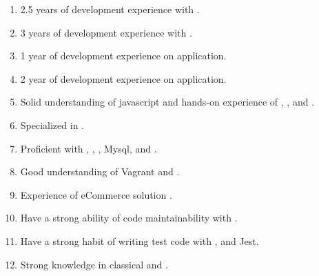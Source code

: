   \begin{enumerate}[leftmargin=4ex, nosep, noitemsep]
    \item 2.5 years of development experience with .
    \item 3 years of development experience with .
    \item 1 year of development experience on  application.
    \item 2 year of development experience on  application.
    \item Solid understanding of javascript and hands-on experience of
        , ,  and .
    \item Specialized in .
    \item Proficient with , , , Mysql, and .
    \item Good understanding of Vagrant and .
    \item Experience of eCommerce solution .
    \item Have a strong ability of code maintainability with .
    \item Have a strong habit of writing test code with ,  and Jest.
    \item Strong knowledge in classical  and .
  \end{enumerate}

